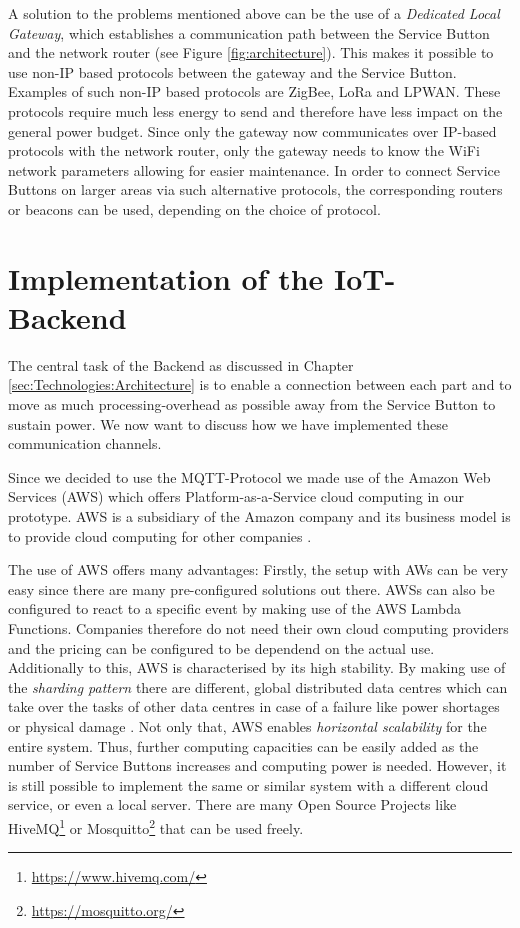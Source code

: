 A solution to the problems mentioned above can be the use of a \textit{Dedicated Local Gateway}, which establishes a communication path between the Service Button and the network router (see Figure \ref{fig:architecture}). This makes it possible to use non-IP based protocols between the gateway and the Service Button. Examples of such non-IP based protocols are ZigBee, LoRa and LPWAN. These protocols require much less energy to send and therefore have less impact on the general power budget. Since only the gateway now communicates over IP-based protocols with the network router, only the gateway needs to know the WiFi network parameters allowing for easier maintenance. In order to connect Service Buttons on larger areas via such alternative protocols, the corresponding routers or beacons can be used, depending on the choice of protocol. \cite{Adryan:TechFound-Components:2017}

\section{Implementation of the IoT-Backend}
\label{sec:Backend}

The central task of the Backend as discussed in Chapter \ref{sec:Technologies:Architecture} is to enable a connection between each part and to move as much processing-overhead as possible away from the Service Button to sustain power. We now want to discuss how we have implemented these communication channels.

Since we decided to use the MQTT-Protocol we made use of the Amazon Web Services (AWS) which offers Platform-as-a-Service cloud computing in our prototype. AWS is a subsidiary of the Amazon company and its business model is to provide cloud computing for other companies \cite{Online:Amazon:AWS}. 

The use of AWS offers many advantages: Firstly, the setup with AWs can be very easy since there are many pre-configured solutions out there. AWSs can also be configured to react to a specific event by making use of the AWS Lambda Functions. Companies therefore do not need their own cloud computing providers and the pricing can be configured to be dependend on the actual use. Additionally to this, AWS is characterised by its high stability. By making use of the \textit{sharding pattern} there are different, global distributed data centres which can take over the tasks of other data centres in case of a failure like power shortages or physical damage  \cite{Online:Amazon:AWSFAQ}. Not only that, AWS enables \textit{horizontal scalability} for the entire system. Thus, further computing capacities can be easily added as the number of Service Buttons increases and computing power is needed. However, it is still possible to implement the same or similar system with a different cloud service, or even a local server. There are many Open Source Projects like HiveMQ\footnote{\url{https://www.hivemq.com/}} or Mosquitto\footnote{\url{https://mosquitto.org/}} that can be used freely. 

